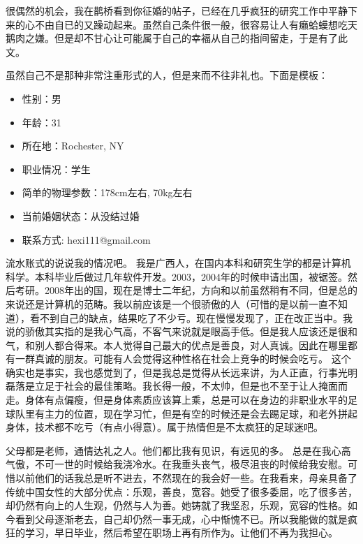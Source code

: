 \documentclass[10pt,letterpaper]{article}
\begin{document}

\begin{CJK}{UTF8}{gbsn}
很偶然的机会，我在鹊桥看到你征婚的帖子，已经在几乎疯狂的研究工作中平静下来的心不由自已的又躁动起来。虽然自己条件很一般，很容易让人有癞蛤蟆想吃天鹅肉之嫌。但是却不甘心让可能属于自己的幸福从自己的指间留走，于是有了此文。

虽然自己不是那种非常注重形式的人，但是来而不往非礼也。下面是模板：

\begin{itemize}
\item  性别：男
\item  年龄：31
\item  所在地：Rochester, NY
\item  职业情况：学生
\item  简单的物理参数：178cm左右, 70kg左右
\item  当前婚姻状态：从没结过婚
\item  联系方式: hexi111@gmail.com
\end{itemize}

流水账式的说说我的情况吧。 我是广西人，在国内本科和研究生学的都是计算机科学。本科毕业后做过几年软件开发。2003，2004年的时候申请出国，被锯签。然后考研。2008年出的国，现在是博士二年纪，方向和以前虽然稍有不同，但是总的来说还是计算机的范畴。我以前应该是一个很骄傲的人（可惜的是以前一直不知道），看不到自己的缺点，结果吃了不少亏。现在慢慢发现了，正在改正当中。我说的骄傲其实指的是我心气高，不客气来说就是眼高手低。但是我人应该还是很和气，和别人都合得来。本人觉得自己最大的优点是善良，对人真诚。因此在哪里都有一群真诚的朋友。可能有人会觉得这种性格在社会上竞争的时候会吃亏。 这个确实也是事实，我也感觉到了，但是我总是觉得从长远来讲，为人正直，行事光明磊落是立足于社会的最佳策略。我长得一般，不太帅，但是也不至于让人掩面而走。身体有点偏瘦，但是身体素质应该算上乘，总是可以在身边的非职业水平的足球队里有主力的位置，现在学习忙，但是有空的时候还是会去踢足球，和老外拼起身体，技术都不吃亏（有点小得意）。属于热情但是不太疯狂的足球迷吧。


父母都是老师，通情达礼之人。他们都比我有见识，有远见的多。 总是在我心高气傲，不可一世的时候给我浇冷水。在我垂头丧气，极尽沮丧的时候给我安慰。可惜以前他们的话我总是听不进去，不然现在的我会好一些。在我看来，母亲具备了传统中国女性的大部分优点：乐观，善良，宽容。她受了很多委屈，吃了很多苦，却仍然有向上的人生观，仍然与人为善。她铸就了我坚忍，乐观，宽容的性格。如今看到父母逐渐老去，自己却仍然一事无成，心中惭愧不已。所以我能做的就是疯狂的学习，早日毕业，然后希望在职场上再有所作为。让他们不再为我担心。


\end{CJK}
\end{document}
